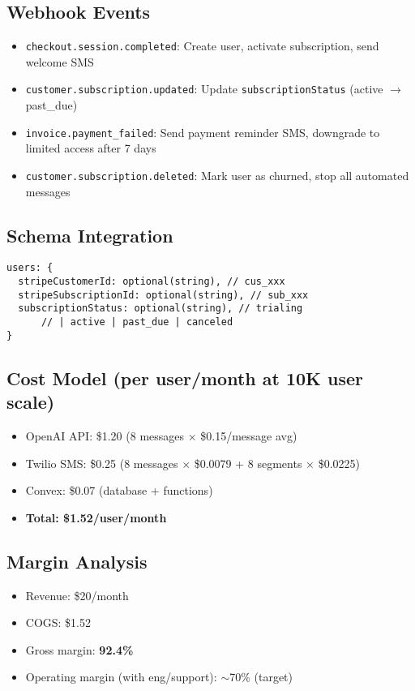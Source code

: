 \documentclass{article}
\begin{document}
\subsection*{Webhook Events}
\begin{itemize}
    \item \texttt{checkout.session.completed}: Create user, activate subscription, send welcome SMS
    \item \texttt{customer.subscription.updated}: Update \texttt{subscriptionStatus} (active $\rightarrow$ past\_due)
    \item \texttt{invoice.payment\_failed}: Send payment reminder SMS, downgrade to limited access after 7 days
    \item \texttt{customer.subscription.deleted}: Mark user as churned, stop all automated messages
\end{itemize}

\subsection*{Schema Integration}
\begin{verbatim}
users: {
  stripeCustomerId: optional(string), // cus_xxx
  stripeSubscriptionId: optional(string), // sub_xxx
  subscriptionStatus: optional(string), // trialing
      // | active | past_due | canceled
}
\end{verbatim}

\subsection*{Cost Model (per user/month at 10K user scale)}
\begin{itemize}
    \item OpenAI API: \$1.20 (8 messages $\times$ \$0.15/message avg)
    \item Twilio SMS: \$0.25 (8 messages $\times$ \$0.0079 + 8 segments $\times$ \$0.0225)
    \item Convex: \$0.07 (database + functions)
    \item \textbf{Total: \$1.52/user/month}
\end{itemize}

\subsection*{Margin Analysis}
\begin{itemize}
    \item Revenue: \$20/month
    \item COGS: \$1.52
    \item Gross margin: \textbf{92.4\%}
    \item Operating margin (with eng/support): $\sim$70\% (target)
\end{itemize}
\end{document}
